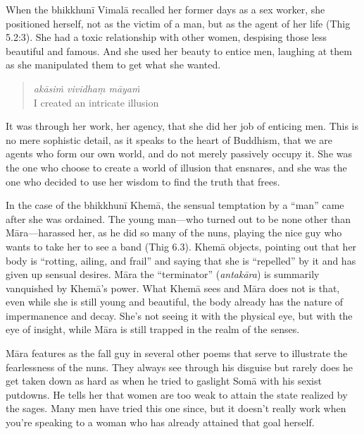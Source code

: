 \documentclass[12pt,openany]{book}%
\begin{document}
When the \textsanskrit{bhikkhunī} \textsanskrit{Vimalā} recalled her former days as a sex worker, she positioned herself, not as the victim of a man, but as the agent of her life (Thig 5.2:3). She had a toxic relationship with other women, despising those less beautiful and famous. And she used her beauty to entice men, laughing at them as she manipulated them to get what she wanted.

\begin{quotation}%
\textit{\textsanskrit{akāsiṁ} vividhaṃ \textsanskrit{māyaṁ}}\\

I created an intricate illusion

%
\end{quotation}

It was through her work, her agency, that she did her job of enticing men. This is no mere sophistic detail, as it speaks to the heart of Buddhism, that we are agents who form our own world, and do not merely passively occupy it. She was the one who choose to create a world of illusion that ensnares, and she was the one who decided to use her wisdom to find the truth that frees.

In the case of the \textsanskrit{bhikkhunī} \textsanskrit{Khemā}, the sensual temptation by a “man” came after she was ordained. The young man—who turned out to be none other than \textsanskrit{Māra}—harassed her, as he did so many of the nuns, playing the nice guy who wants to take her to see a band (Thig 6.3). \textsanskrit{Khemā} objects, pointing out that her body is “rotting, ailing, and frail” and saying that she is “repelled” by it and has given up sensual desires. \textsanskrit{Māra} the “terminator” (\textit{\textsanskrit{antakāra}}) is summarily vanquished by \textsanskrit{Khemā}’s power. What \textsanskrit{Khemā} sees and \textsanskrit{Māra} does not is that, even while she is still young and beautiful, the body already has the nature of impermanence and decay. She’s not seeing it with the physical eye, but with the eye of insight, while \textsanskrit{Māra} is still trapped in the realm of the senses.

\textsanskrit{Māra} features as the fall guy in several other poems that serve to illustrate the fearlessness of the nuns. They always see through his disguise but rarely does he get taken down as hard as when he tried to gaslight \textsanskrit{Somā} with his sexist putdowns. He tells her that women are too weak to attain the state realized by the sages. Many men have tried this one since, but it doesn’t really work when you’re speaking to a woman who has already attained that goal herself.
\end{document}
